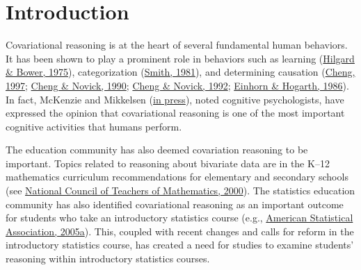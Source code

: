 \documentclass[11pt]{umnthesis}
\begin{document}
\makeatletter
\def\maxwidth{ %
  \ifdim\Gin@nat@width>\linewidth
    \linewidth
  \else
    \Gin@nat@width
  \fi
}
\makeatother

\renewcommand{\contentsname}{Table of Contents}

\setlength{\parskip}{0pt}

\providecommand{\tightlist}{%
  \setlength{\itemsep}{0pt}\setlength{\parskip}{0pt}}

\tableofcontents{}



  \cleardoublepage
  \listoftables



  \cleardoublepage
  \listoffigures




\mainmatter 
\pagestyle{fancyplain} %

\hypertarget{intro}{%
\chapter{Introduction}\label{intro}}

Covariational reasoning is at the heart of several fundamental human behaviors. It
has been shown to play a prominent role in behaviors such as learning (\protect\hyperlink{ref-hilgard:1975}{Hilgard \& Bower, 1975}), categorization (\protect\hyperlink{ref-smith:1981}{Smith, 1981}), and determining causation (\protect\hyperlink{ref-cheng:1997}{Cheng, 1997}; \protect\hyperlink{ref-cheng:1990}{Cheng \& Novick, 1990}; \protect\hyperlink{ref-cheng:1992}{Cheng \& Novick, 1992}; \protect\hyperlink{ref-einhorn:1986}{Einhorn \& Hogarth, 1986}). In fact, McKenzie and Mikkelsen (\protect\hyperlink{ref-mckenzie:inpress}{in press}), noted cognitive psychologists, have expressed the opinion that covariational reasoning is one of the most important cognitive activities that humans perform.

The education community has also deemed covariation reasoning to be important. Topics related to reasoning about bivariate data are in the K--12 mathematics curriculum recommendations for elementary and secondary schools (see \protect\hyperlink{ref-nctm:2000}{National Council of Teachers of Mathematics, 2000}). The statistics education community has also identified covariational reasoning as an important outcome for students who take an introductory statistics course (e.g., \protect\hyperlink{ref-asa:2005}{American Statistical Association, 2005a}). This, coupled with recent changes and calls for reform in the introductory statistics course, has created a need for studies to examine students' reasoning within introductory statistics courses.
\end{document}
